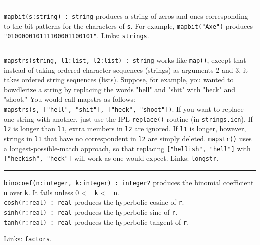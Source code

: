 \vspace{0.25cm}\hrule{}

\texttt{mapbit(s:string) : string} produces a string of zeros and ones
corresponding to the bit patterns for the characters of \texttt{s}.
For example, \texttt{mapbit("Axe")} produces \linebreak
\texttt{"010000010111100001100101"}. Links:
\texttt{strings}. 

\vspace{0.25cm}\hrule{}

\texttt{mapstrs(string, l1:list, l2:list) : string} works like
\texttt{map()}, except that instead of taking ordered character
sequences (strings) as arguments 2 and 3, it takes ordered string
sequences (lists). Suppose, for example, you wanted to
bowdlerize a string by replacing the words
"hell" and
"shit" with
"heck" and
"shoot." You would call mapstrs as
follows:\\
\texttt{mapstrs(s, ["hell",
"shit"],
["heck",
"shoot"])}. If you want to replace one
string with another, just use the IPL \texttt{replace()} routine (in
\texttt{strings.icn}). If \texttt{l2} is longer than \texttt{l1}, extra
members in \texttt{l2} are ignored. If \texttt{l1} is longer, however,
strings in \texttt{l1} that have no correspondent in \texttt{l2} are
simply deleted. \texttt{mapstr()} uses a longest-possible-match
approach, so that replacing
\texttt{["hellish",
"hell"]} with
\texttt{["heckish",
"heck"]} will work as one would expect.
Links: \texttt{longstr}.

\vspace{0.25cm}\hrule{}

\texttt{binocoef(n:integer, k:integer) : integer?} produces the
binomial coefficient \texttt{n} over
\texttt{k}. It fails unless 0 {\textless}= \texttt{k} {\textless}=
\texttt{n}.\\
\texttt{cosh(r:real) : real} produces the hyperbolic cosine of \texttt{r}.\\
\texttt{sinh(r:real) : real} produces the hyperbolic sine of
\texttt{r}.\\
\texttt{tanh(r:real) : real} produces the hyperbolic tangent of
\texttt{r}.

Links: \texttt{factors}.

